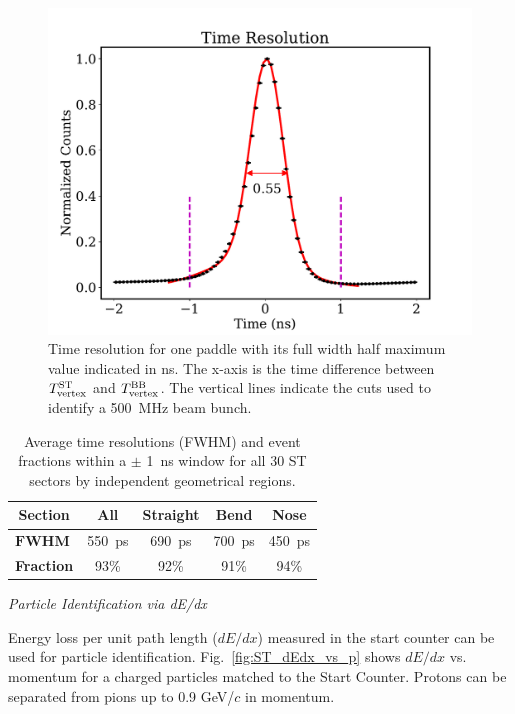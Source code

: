 \begin{figure}[!htb]
  \centering
  \includegraphics[width=1.0\linewidth]{figures/st_tr_fit.pdf}
  \caption{Time resolution for one paddle with its full width half
    maximum value indicated in ns.  The x-axis is the time difference
    between $T^{\rm ST}_{\rm vertex}$ and $T^{\rm BB}_{\rm vertex}$.
    The vertical lines indicate the cuts used to identify a 500~MHz beam bunch.}
                \label{fig:st-time-resolution}
\end{figure}  

\begin{table}[htbp]
  \centering
  \begin{tabular}{@{} l *4c @{}}
    \hline
    \multicolumn{1}{c}{\textbf{Section}}    & \textbf{All}  & \textbf{Straight}  & \textbf{Bend}  & \textbf{Nose}  \\ 
    \hline
    $\mathbf{FWHM}$ & 550~ps & 690~ps & 700~ps & 450~ps \\ 
    \textbf{Fraction} & 93\% & 92\% & 91\% & 94\% \\\hline
  \end{tabular}
  \caption{Average time resolutions (FWHM) and event fractions within a $\pm$ 1~ns window for all 30 ST sectors by independent geometrical regions.}
  \label{table:st-time-resolution}
\end{table}  

\smallskip

{\it Particle Identification via dE/dx}

\smallskip

Energy loss per unit path length ($dE/dx$) measured in the start
counter can be used for particle
identification. Fig.~\ref{fig:ST_dEdx_vs_p} shows $dE/dx$ vs. momentum
for a charged particles matched to the Start Counter. Protons can be
separated from pions up to 0.9 GeV/$c$ in momentum.

